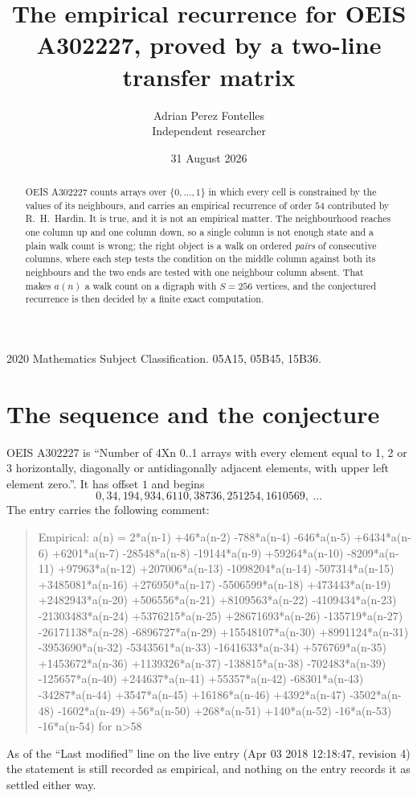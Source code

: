 \documentclass[11pt,a4paper]{article}
\title{The empirical recurrence for OEIS A302227, proved by a two-line transfer matrix}
\author{Adrian Perez Fontelles\\ \small Independent researcher}
\date{31 August 2026}
\theoremstyle{plain}
\theoremstyle{definition}
\begin{document}
\maketitle

\begin{abstract}
OEIS A302227 counts arrays over $\{0,\dots,1\}$ in which every cell is constrained by the
values of its neighbours, and carries an empirical recurrence of order $54$ contributed
by R.~H.~Hardin. It is true, and it is not an empirical matter. The neighbourhood reaches one
column up and one column down, so a single column is not enough state and a plain walk count
is wrong; the right object is a walk on ordered \emph{pairs} of consecutive columns, where
each step tests the condition on the middle column against both its neighbours and the two
ends are tested with one neighbour column absent. That makes $a(n)$ a walk count on a digraph
with $S=256$ vertices, and the conjectured recurrence is then decided by a finite exact
computation.
\end{abstract}

\noindent\small 2020 Mathematics Subject Classification. 05A15, 05B45, 15B36.\normalsize

\section{The sequence and the conjecture}

OEIS A302227 is ``Number of 4Xn 0..1 arrays with every element equal to 1, 2 or 3 horizontally, diagonally or antidiagonally adjacent elements, with upper left element zero.''. It has offset $1$ and begins
\[
0, 34, 194, 934, 6110, 38736, 251254, 1610569,\ \dots
\]
The entry carries the following comment:
\begin{quote}\small
Empirical: a(n) = 2*a(n-1) +46*a(n-2) -788*a(n-4) -646*a(n-5) +6434*a(n-6) +6201*a(n-7) -28548*a(n-8) -19144*a(n-9) +59264*a(n-10) -8209*a(n-11) +97963*a(n-12) +207006*a(n-13) -1098204*a(n-14) -507314*a(n-15) +3485081*a(n-16) +276950*a(n-17) -5506599*a(n-18) +473443*a(n-19) +2482943*a(n-20) +506556*a(n-21) +8109563*a(n-22) -4109434*a(n-23) -21303483*a(n-24) +5376215*a(n-25) +28671693*a(n-26) -135719*a(n-27) -26171138*a(n-28) -6896727*a(n-29) +15548107*a(n-30) +8991124*a(n-31) -3953690*a(n-32) -5343561*a(n-33) -1641633*a(n-34) +576769*a(n-35) +1453672*a(n-36) +1139326*a(n-37) -138815*a(n-38) -702483*a(n-39) -125657*a(n-40) +244637*a(n-41) +55357*a(n-42) -68301*a(n-43) -34287*a(n-44) +3547*a(n-45) +16186*a(n-46) +4392*a(n-47) -3502*a(n-48) -1602*a(n-49) +56*a(n-50) +268*a(n-51) +140*a(n-52) -16*a(n-53) -16*a(n-54) for n>58
\end{quote}
As of the ``Last modified'' line on the live entry (Apr 03 2018 12:18:47, revision 4) the statement is
still recorded as empirical, and nothing on the entry records it as settled either way.
\end{document}
